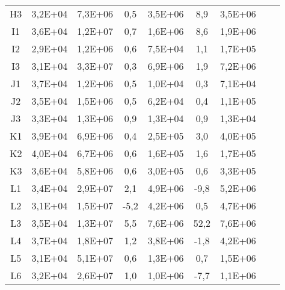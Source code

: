 \begin{center}
\begin{longtable}{ccccccccc}
H3    & 3,2E+04 & 7,3E+06 & 0,5   & 3,5E+06 & 8,9   & 3,5E+06 \\
I1    & 3,6E+04 & 1,2E+07 & 0,7   & 1,6E+06 & 8,6   & 1,9E+06 \\
I2    & 2,9E+04 & 1,2E+06 & 0,6   & 7,5E+04 & 1,1   & 1,7E+05 \\
I3    & 3,1E+04 & 3,3E+07 & 0,3   & 6,9E+06 & 1,9   & 7,2E+06 \\
J1    & 3,7E+04 & 1,2E+06 & 0,5   & 1,0E+04 & 0,3   & 7,1E+04 \\
J2    & 3,5E+04 & 1,5E+06 & 0,5   & 6,2E+04 & 0,4   & 1,1E+05 \\
J3    & 3,3E+04 & 1,3E+06 & 0,9   & 1,3E+04 & 0,9   & 1,3E+04 \\
K1    & 3,9E+04 & 6,9E+06 & 0,4   & 2,5E+05 & 3,0   & 4,0E+05 \\
K2    & 4,0E+04 & 6,7E+06 & 0,6   & 1,6E+05 & 1,6   & 1,7E+05 \\
K3    & 3,6E+04 & 5,8E+06 & 0,6   & 3,0E+05 & 0,6   & 3,3E+05 \\
L1    & 3,4E+04 & 2,9E+07 & 2,1   & 4,9E+06 & -9,8  & 5,2E+06 \\
L2    & 3,1E+04 & 1,5E+07 & -5,2  & 4,2E+06 & 0,5   & 4,7E+06 \\
L3    & 3,5E+04 & 1,3E+07 & 5,5   & 7,6E+06 & 52,2  & 7,6E+06 \\
L4    & 3,7E+04 & 1,8E+07 & 1,2   & 3,8E+06 & -1,8  & 4,2E+06 \\
L5    & 3,1E+04 & 5,1E+07 & 0,6   & 1,3E+06 & 0,7   & 1,5E+06 \\
L6    & 3,2E+04 & 2,6E+07 & 1,0   & 1,0E+06 & -7,7  & 1,1E+06 \\
\end{longtable}
\end{center}

